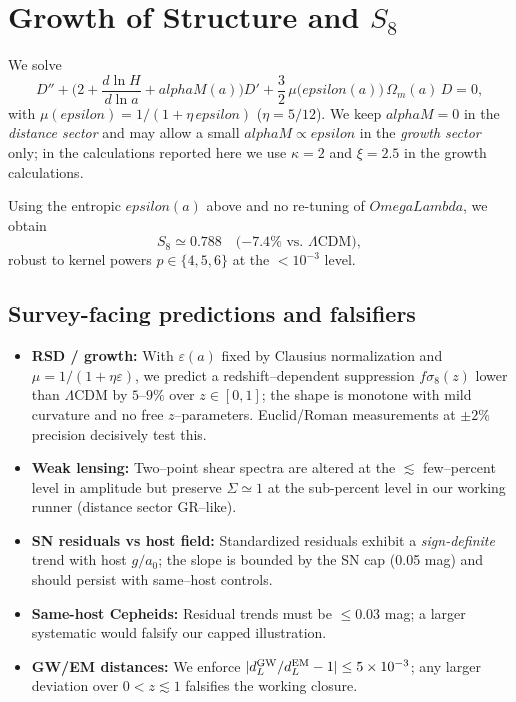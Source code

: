 \documentclass[aps,prd,onecolumn,superscriptaddress,nofootinbib]{revtex4-2}
\def\OmL{OmegaLambda}%
\def\alphaM{alphaM}%
\def\eps{epsilon}%
\newcommand{\OmL}{\Omega_\Lambda}
\newcommand{\alphaM}{\alpha_M}
\newcommand{\eps}{\varepsilon}
\begin{document}
\section{Growth of Structure and \texorpdfstring{$S_8$}{S8}}
\label{sec:growth}
We solve
\begin{equation}
D''+\Big(2+\frac{d\ln H}{d\ln a}+\alphaM(a)\Big)D' + \frac{3}{2}\,\mu\big(\eps(a)\big)\,\Omega_m(a)\,D=0,
\end{equation}
with $\mu(\eps)=1/(1+\eta\,\eps)$ ($\eta=5/12$). We keep $\alphaM=0$ in the \emph{distance sector} and may allow a small $\alphaM\propto \eps$ in the \emph{growth sector} only; in the calculations reported here we use $\kappa=2$ and $\xi=2.5$ in the growth calculations.

Using the entropic $\eps(a)$ above and no re-tuning of $\OmL$, we obtain
\begin{equation}
S_8\simeq 0.788\quad \text{($-7.4\%$ vs.\ $\Lambda$CDM)},
\end{equation}
robust to kernel powers $p\in\{4,5,6\}$ at the $<10^{-3}$ level.

\subsection{Survey-facing predictions and falsifiers}
\label{sec:survey-preds}
\begin{itemize}[leftmargin=1.2em]
\item \textbf{RSD / growth:} With $\varepsilon(a)$ fixed by Clausius normalization and $\mu=1/(1+\eta\varepsilon)$, we predict a redshift–dependent suppression 
$f\sigma_8(z)$ lower than $\Lambda$CDM by $5$–$9\%$ over $z\!\in\![0,1]$; the shape is monotone with mild curvature and no free $z$–parameters. Euclid/Roman measurements at $\pm 2\%$ precision decisively test this.
\item \textbf{Weak lensing:} Two–point shear spectra are altered at the $\lesssim$ few–percent level in amplitude but preserve $\Sigma\simeq 1$ at the sub-percent level in our working runner (distance sector GR–like).
\item \textbf{SN residuals vs host field:} Standardized residuals exhibit a \emph{sign-definite} trend with host $g/a_0$; the slope is bounded by the SN cap (0.05 mag) and should persist with same–host controls.
\item \textbf{Same-host Cepheids:} Residual trends must be $\le 0.03$ mag; a larger systematic would falsify our capped illustration.
\item \textbf{GW/EM distances:} We enforce $|d_L^{\rm GW}/d_L^{\rm EM}-1|\le 5\times10^{-3}$; any larger deviation over $0<z\lesssim 1$ falsifies the working closure.
\end{itemize}
\end{document}

